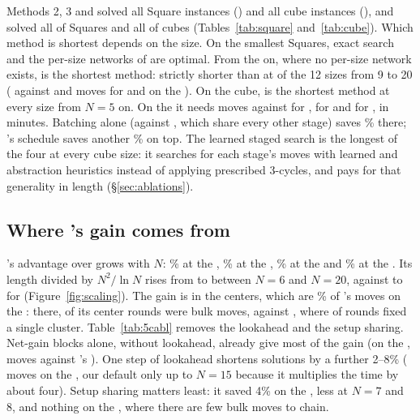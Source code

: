 Methods 2, 3 and \FiveC solved all Square instances (\SqSolvedFiveC{}) and all cube instances
(\CuSolvedFiveC{}), and \FiveB solved all \SqSolved{} of \SqTotal{} Squares and all \CuSolved{} of
\CuTotal{} cubes (Tables~\ref{tab:square} and~\ref{tab:cube}). Which method is shortest depends on
the size. On the smallest Squares, exact search and the per-size networks of \Mfour are optimal. From
the  on, where no per-size network exists, \FiveC is the shortest method: strictly shorter than
\Mthree at \SqFiveCBetter{} of the 12 sizes from 9 to 20
(\SqTwentyHTMFiveC{} against \SqTwentyHTMMthree{} and \SqTwentyHTMMtwo{} moves for \Mthree and \Mtwo on
the ). On the cube, \FiveC is the shortest method at every size from $N=5$ on. On the 
it needs \CuTwentyHTMFiveC{} moves against \CuTwentyHTMMthree{} for \Mthree, \CuTwentyHTMMtwo{} for
\Mtwo and \CuTwentyHTM{} for \FiveB, in \FiveCTwentyMin{} minutes. Batching alone (\Mthree against
\Mtwo, which share every other stage) saves \MthreevsMtwoTwenty\% there; \FiveC's schedule saves
another \FiveCGainTwenty\% on top. The learned staged search \FiveB is the longest of the four at
every cube size: it searches for each stage's moves with learned and abstraction heuristics instead of
applying prescribed 3-cycles, and pays for that generality in length (\S\ref{sec:ablations}).

\subsection{Where \FiveC's gain comes from}
\label{sec:5cresults}

\FiveC's advantage over \Mthree grows with $N$: \FiveCGainSix\% at the , \FiveCGainTen\% at the
, \FiveCGainFifteen\% at the  and \FiveCGainTwenty\% at the . Its length divided
by $N^2/\ln N$ rises from \CuNormSixFiveC{} to \CuNormTwentyFiveC{} between $N=6$ and $N=20$, against
\CuNormSixMthree{} to \CuNormTwentyMthree{} for \Mthree (Figure~\ref{fig:scaling}). The gain is in the
centers, which are \FiveCCenterShareTwenty\% of \FiveC's moves on the : there,
\FiveCBulkRoundsTwenty{} of its \FiveCRoundsTwenty{} center rounds were bulk moves, against
\Mthree, where \MthreeSingleRoundsTwenty{} of \MthreeRoundsTwenty{} rounds fixed a single cluster.
Table~\ref{tab:5cabl} removes the lookahead and the setup sharing. Net-gain blocks alone, without
lookahead, already give most of the gain (on the , \FiveCNoLookaheadTwenty{} moves against
\Mthree's \CuTwentyHTMMthree{}). One step of lookahead shortens solutions by a further 2--8\%
(\FiveCLookaheadTwenty{} moves on the , our default only up to $N=15$ because it multiplies the
time by about four). Setup sharing matters least: it saved 4\% on the , less at $N=7$ and 8, and
nothing on the , where there are few bulk moves to chain.

